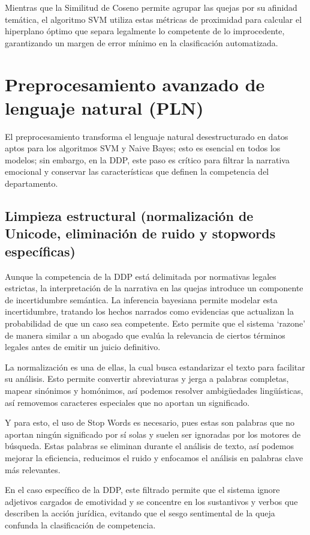 Mientras que la Similitud de Coseno permite agrupar las quejas por su afinidad temática, el algoritmo SVM utiliza estas métricas de proximidad para calcular el hiperplano óptimo que separa legalmente lo competente de lo improcedente, garantizando un margen de error mínimo en la clasificación automatizada.

\section{Preprocesamiento avanzado de lenguaje natural (PLN)}

El preprocesamiento transforma el lenguaje natural desestructurado en datos aptos para los algoritmos SVM y Naive Bayes; esto es esencial en todos los modelos; sin embargo, en la DDP, este paso es crítico para filtrar la narrativa emocional y conservar las características que definen la competencia del departamento.

\subsection{Limpieza estructural (normalización de Unicode, eliminación de ruido y stopwords específicas)}

Aunque la competencia de la DDP está delimitada por normativas legales estrictas, la interpretación de la narrativa en las quejas introduce un componente de incertidumbre semántica. La inferencia bayesiana permite modelar esta incertidumbre, tratando los hechos narrados como evidencias que actualizan la probabilidad de que un caso sea competente. Esto permite que el sistema ‘razone’ de manera similar a un abogado que evalúa la relevancia de ciertos términos legales antes de emitir un juicio definitivo.

La normalización es una de ellas, la cual busca estandarizar el texto para facilitar su análisis. Esto permite convertir abreviaturas y jerga a palabras completas, mapear sinónimos y homónimos, así podemos resolver ambigüedades lingüísticas, así removemos caracteres especiales que no aportan un significado.

Y para esto, el uso de Stop Words es necesario, pues estas son palabras que no aportan ningún significado por sí solas y suelen ser ignoradas por los motores de búsqueda. Estas palabras se eliminan durante el análisis de texto, así podemos mejorar la eficiencia, reducimos el ruido y enfocamos el análisis en palabras clave más relevantes.

En el caso específico de la DDP, este filtrado permite que el sistema ignore adjetivos cargados de emotividad y se concentre en los sustantivos y verbos que describen la acción jurídica, evitando que el sesgo sentimental de la queja confunda la clasificación de competencia.

